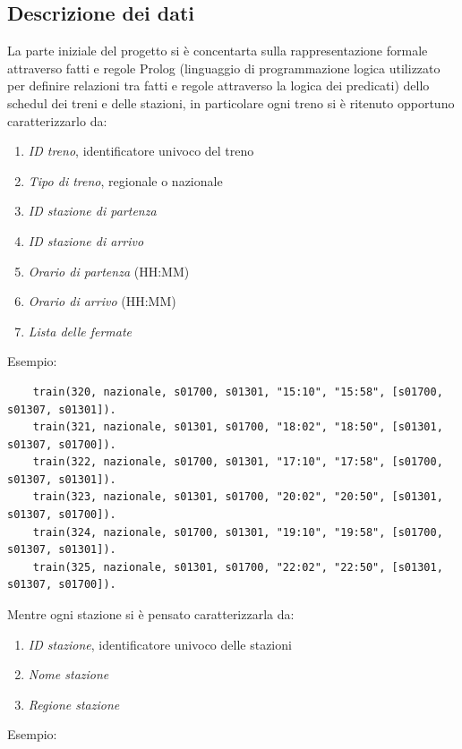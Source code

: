 \documentclass[italian,12pt,a4paper]{article}
\begin{document}
	\subsection{Descrizione dei dati}
	La parte iniziale del progetto si è concentarta sulla rappresentazione formale attraverso fatti e regole Prolog (linguaggio di programmazione logica utilizzato per definire relazioni tra fatti e regole attraverso la logica dei predicati) dello schedul dei treni e delle stazioni, in particolare ogni treno si è ritenuto opportuno caratterizzarlo da:
	
		\begin{enumerate}
			\item \textit{ID treno}, identificatore univoco del treno
			\item \textit{Tipo di treno}, regionale o nazionale
			\item \textit{ID stazione di partenza}
			\item \textit{ID stazione di arrivo}
			\item\textit{ Orario di partenza} (HH:MM)
			\item \textit{Orario di arrivo} (HH:MM)
			\item \textit{Lista delle fermate}
		\end{enumerate}
		Esempio:
		
\begin{small}

\begin{verbatim}
	train(320, nazionale, s01700, s01301, "15:10", "15:58", [s01700, s01307, s01301]).
	train(321, nazionale, s01301, s01700, "18:02", "18:50", [s01301, s01307, s01700]).
	train(322, nazionale, s01700, s01301, "17:10", "17:58", [s01700, s01307, s01301]).
	train(323, nazionale, s01301, s01700, "20:02", "20:50", [s01301, s01307, s01700]).
	train(324, nazionale, s01700, s01301, "19:10", "19:58", [s01700, s01307, s01301]).
	train(325, nazionale, s01301, s01700, "22:02", "22:50", [s01301, s01307, s01700]).
\end{verbatim}
\end{small}
	Mentre ogni stazione si è pensato caratterizzarla da:
	
			\begin{enumerate}
				\item \textit{ID stazione}, identificatore univoco delle stazioni
				\item \textit{Nome stazione}
				\item \textit{Regione stazione}
			\end{enumerate}
		Esempio:
\end{document}
